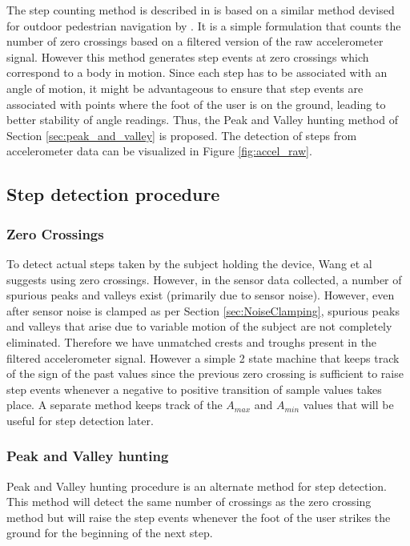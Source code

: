 The step counting method is described in \cite{Wang} is based on a similar 
method devised for outdoor pedestrian navigation by \cite{Ladetto}. It is a
simple formulation that counts the number of zero crossings based on a 
filtered version of the raw accelerometer signal. However this method generates 
step events at zero crossings which correspond to a body in motion. 
Since each step has to be associated with an angle of motion, it might be 
advantageous to ensure that step events are associated with points where 
the foot of the user is on the ground, leading to better stability of angle 
readings. Thus, the Peak and Valley hunting method of 
Section \ref{sec:peak_and_valley} is proposed. The detection of steps from 
accelerometer data can be visualized in Figure \ref{fig:accel_raw}.

\subsection{Step detection procedure\label{sec:step_detection}}

\subsubsection{Zero Crossings}

To detect actual steps taken by the subject holding the device, Wang et al\cite{Wang} 
suggests using zero crossings. However, in the sensor data collected, a number
of spurious peaks and valleys exist (primarily due to sensor noise). However, 
even after sensor noise is clamped as per Section \ref{sec:NoiseClamping}, 
spurious peaks and valleys that arise due to variable motion of the subject 
are not completely eliminated. Therefore we have unmatched crests and troughs
present in the filtered accelerometer signal. However a simple 2 state 
machine that keeps track of the sign of the past values since the previous 
zero crossing is sufficient to raise step events whenever a negative to positive
transition of sample values takes place. A separate method keeps track 
of the $A_{max}$ and $A_{min}$ values that will be useful for step detection 
later.

\subsubsection{Peak and Valley hunting\label{sec:peak_and_valley}}

Peak and Valley hunting procedure is an alternate method for step detection.
This method will detect the same number of crossings as the zero crossing 
method but will raise the step events whenever the foot of the user 
strikes the ground for the beginning of the next step. 

